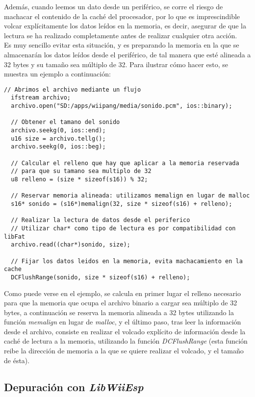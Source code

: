 Además, cuando leemos un dato desde un periférico, se corre el riesgo de machacar el contenido de la caché del procesador, por lo que es imprescindible volcar explícitamente los datos leídos en la memoria, es decir, asegurar de que la lectura se ha realizado completamente antes de realizar cualquier otra acción. \\

Es muy sencillo evitar esta situación, y es preparando la memoria en la que se almacenarán los datos leídos desde el periférico, de tal manera que esté alineada a 32 bytes y su tamaño sea múltiplo de 32. Para ilustrar cómo hacer esto, se muestra un ejemplo a continuación:

\begin{lstlisting}[style=C++]
  // Abrimos el archivo mediante un flujo
  ifstream archivo;
  archivo.open("SD:/apps/wiipang/media/sonido.pcm", ios::binary);

  // Obtener el tamano del sonido
  archivo.seekg(0, ios::end);
  u16 size = archivo.tellg();
  archivo.seekg(0, ios::beg);

  // Calcular el relleno que hay que aplicar a la memoria reservada
  // para que su tamano sea multiplo de 32
  u8 relleno = (size * sizeof(s16)) % 32;

  // Reservar memoria alineada: utilizamos memalign en lugar de malloc
  s16* sonido = (s16*)memalign(32, size * sizeof(s16) + relleno);

  // Realizar la lectura de datos desde el periferico
  // Utilizar char* como tipo de lectura es por compatibilidad con libFat
  archivo.read((char*)sonido, size);

  // Fijar los datos leidos en la memoria, evita machacamiento en la cache
  DCFlushRange(sonido, size * sizeof(s16) + relleno);
\end{lstlisting}

Como puede verse en el ejemplo, se calcula en primer lugar el relleno necesario para que la memoria que ocupa el archivo binario a cargar sea múltiplo de 32 bytes, a continuación se reserva la memoria alineada a 32 bytes utilizando la función \emph{memalign} en lugar de \emph{malloc}, y el último paso, tras leer la información desde el archivo, consiste en realizar el volcado explícito de información desde la caché de lectura a la memoria, utilizando la función \emph{DCFlushRange} (esta función reibe la dirección de memoria a la que se quiere realizar el volcado, y el tamaño de ésta).

\subsection{Depuración con \emph{LibWiiEsp}}

